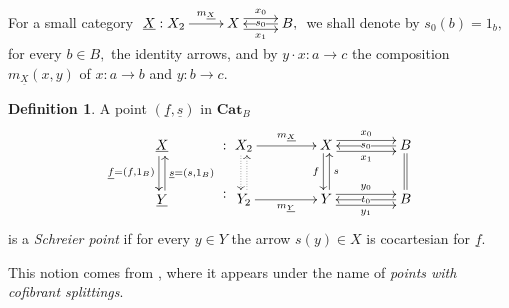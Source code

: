 \documentclass[11pt]{amsart}
\theoremstyle{plain}
\theoremstyle{definition}
\newtheorem{definition}[subsubsection]{Definition}
\theoremstyle{remark}
\newcommand{\un}{\underline}
\begin{document}
For a small category $\xymatrix{{\underline{X}:X_2} \ar[r]^-{m_{\un{X}}} &{X} \ar@<.9ex>[r]^-{x_0} \ar@<-.9ex>[r]_-{x_1} &{B,} \ar[l]|-{s_0}}$ we shall denote by $s_0(b)=1_b,$ for every $b\in B,$ the identity arrows, and by $y\cdot x\colon a\rightarrow c$ the composition $m_{\un{X}}(x,y)$ of $x\colon a\rightarrow b$ and $y\colon b\rightarrow c.$
\begin{definition}
\label{def:schreier_point_cat}
A point $(\underline{f},\underline{s})$ in $\mathbf{Cat}_B$
\begin{equation}
\begin{aligned}
\label{eqn:sch-pt-cat}
{
\xymatrix{
{\underline{X}} \ar@<-.5ex>[d]_-{\underline{f}=(f,1_B)}\\
{\underline{Y}} \ar@<-.5ex>[u]_-{\underline{s}=(s,1_B)}
}
}
{\xymatrix{: \\ :}}
{
\xymatrixcolsep{3.5pc}
\xymatrix{
{X_2} \ar[r]^-{m_{\un{X}}} \ar@{.>}@<-.5ex>[d] &{X} \ar@<-.5ex>[d]_-{f} \ar@<.9ex>[r]^-{x_0} \ar@<-.9ex>[r]_-{x_1} &{B} \ar@{=}[d] \ar[l]|{s_0} \\
{Y_2} \ar[r]_-{m_{\un{Y}}} \ar@{.>}@<-.5ex>[u] &{Y} \ar@<-.5ex>[u]_-{s} \ar@<.9ex>[r]^-{y_0} \ar@<-.9ex>[r]_-{y_1} &{B} \ar[l]|{t_0}
}
}
\end{aligned}
\end{equation}
is a \emph{Schreier point} if for every $y\in Y$ the arrow $s(y)\in X$ is cocartesian for $\underline{f}.$
\end{definition}
This notion comes from \cite{mal'tsev-reflection}, where it appears under the name of \emph{points with cofibrant splittings}.
\end{document}
